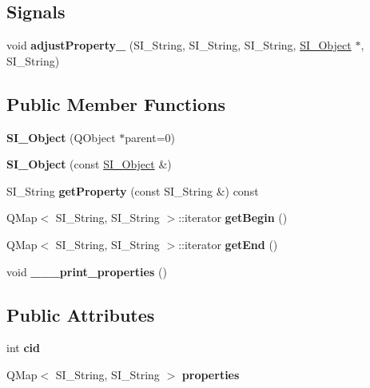 \subsection*{Signals}
\begin{DoxyCompactItemize}
\item 
\mbox{\label{class_s_i___object_acead0d8f20e267fc9c40cf865c975769}} 
void {\bfseries adjust\+Property\+\_\+} (S\+I\+\_\+\+String, S\+I\+\_\+\+String, S\+I\+\_\+\+String, \hyperlink{class_s_i___object}{S\+I\+\_\+\+Object} $\ast$, S\+I\+\_\+\+String)
\end{DoxyCompactItemize}
\subsection*{Public Member Functions}
\begin{DoxyCompactItemize}
\item 
\mbox{\label{class_s_i___object_a6ec637849a43d4d6eb9cd41f649cc1ec}} 
{\bfseries S\+I\+\_\+\+Object} (Q\+Object $\ast$parent=0)
\item 
\mbox{\label{class_s_i___object_a9ec2d414baa9b92d0fd6a3404f2ee2d7}} 
{\bfseries S\+I\+\_\+\+Object} (const \hyperlink{class_s_i___object}{S\+I\+\_\+\+Object} \&)
\item 
\mbox{\label{class_s_i___object_a68431e1d8f5383b8519cf5a451737cb8}} 
S\+I\+\_\+\+String {\bfseries get\+Property} (const S\+I\+\_\+\+String \&) const
\item 
\mbox{\label{class_s_i___object_af617bfe0cbc89aa2a62ceeb2b34233d3}} 
Q\+Map$<$ S\+I\+\_\+\+String, S\+I\+\_\+\+String $>$\+::iterator {\bfseries get\+Begin} ()
\item 
\mbox{\label{class_s_i___object_ac2a9abad4b05bfc1800a915bcbe63025}} 
Q\+Map$<$ S\+I\+\_\+\+String, S\+I\+\_\+\+String $>$\+::iterator {\bfseries get\+End} ()
\item 
\mbox{\label{class_s_i___object_a2464e6bfc480a09dca8ad7d610660f90}} 
void {\bfseries \+\_\+\+\_\+\+\_\+print\+\_\+properties} ()
\end{DoxyCompactItemize}
\subsection*{Public Attributes}
\begin{DoxyCompactItemize}
\item 
\mbox{\label{class_s_i___object_a60fee6a8b9601dc6caf0d0c84daa703a}} 
int {\bfseries cid}
\item 
\mbox{\label{class_s_i___object_a32f0018fcbae8593d45f84cf06f33f8e}} 
Q\+Map$<$ S\+I\+\_\+\+String, S\+I\+\_\+\+String $>$ {\bfseries properties}
\end{DoxyCompactItemize}


